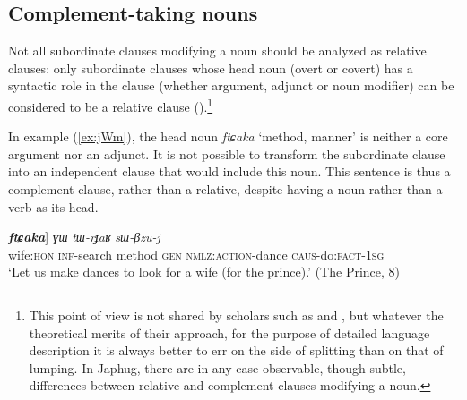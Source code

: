 \documentclass[oneside,a4paper,11pt]{article}
\newcommand{\ipa}[1]{\textit{\phon#1}}
\newcommand{\jpg}[2]{\ipa{#1} `#2'}
\newcommand{\refb}[1]{(\ref{#1})}
\begin{document}
\subsection{Complement-taking nouns} \label{sec:comp.noun}
 Not all subordinate clauses modifying a noun should be analyzed as relative clauses: only subordinate clauses whose head noun (overt or covert) has a syntactic role in the clause (whether argument, adjunct or noun modifier) can be considered to be a relative clause (\citealt{jackson06guanxiju, jacques16relatives}).\footnote{This point of view is not shared by scholars such as \citet{matsumoto88adnominal} and \citet{comrie98relatives.rethinking}, but whatever the theoretical merits of their approach, for the purpose of detailed language description it is always better to err on the side of splitting than on that of lumping.  In Japhug, there are in any case observable, though subtle, differences between relative and complement clauses modifying a noun.}

 In example \refb{ex:jWm}, the head noun \jpg{ftɕaka}{method, manner} is neither a core argument nor an adjunct. It is not possible to transform the subordinate clause into an independent clause that would include this noun. This sentence  is thus a complement clause, rather than a relative, despite having a noun rather than a verb as its head. 
   
   \begin{exe}
   \ex  \label{ex:jWm}
\gll
[[\ipa{jɯm}  	\ipa{kɤ-ɕar}]  	  \textbf{\ipa{ftɕaka}}]   \ipa{ɣɯ}	 	\ipa{tɯ-rɟaʁ}    	\ipa{sɯ-βzu-j}  \\
wife:\textsc{hon} \textsc{inf}-search   method   \textsc{gen} \textsc{nmlz:action}-dance \textsc{caus}-do:\textsc{fact}-\textsc{1sg} \\ 
\glt `Let us make dances to look for a wife (for the prince).' (The Prince, 8)
   \end{exe}

%
\end{document}
